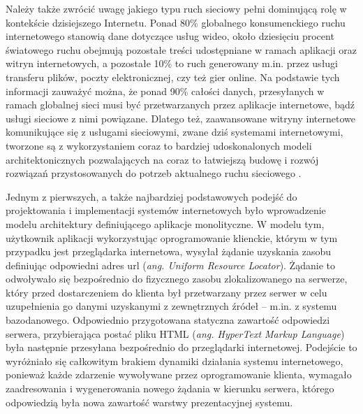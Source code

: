 Należy także zwrócić uwagę jakiego typu ruch sieciowy pełni dominującą rolę w kontekście dzisiejszego Internetu. Ponad 80\% globalnego konsumenckiego ruchu internetowego stanowią dane dotyczące usług wideo, około dziesięciu procent światowego ruchu obejmują pozostałe treści udostępniane w ramach aplikacji oraz witryn internetowych, a pozostałe 10\% to ruch generowany m.in. przez usługi transferu plików, poczty elektronicznej, czy też gier online. Na podstawie tych informacji zauważyć można, że ponad 90\% całości danych, przesyłanych w ramach globalnej sieci musi być przetwarzanych przez aplikacje internetowe, bądź usługi sieciowe z nimi powiązane. Dlatego też, zaawansowane witryny internetowe komunikujące się z usługami sieciowymi, zwane dziś systemami internetowymi, tworzone są z wykorzystaniem coraz to bardziej udoskonalonych modeli architektonicznych pozwalających na coraz to łatwiejszą budowę i rozwój rozwiązań przystosowanych do potrzeb aktualnego ruchu sieciowego \cite{CAIR20182023}.

Jednym z pierwszych, a także najbardziej podstawowych podejść do projektowania i implementacji systemów internetowych było wprowadzenie modelu architektury definiującego aplikacje monolityczne. W modelu tym, użytkownik aplikacji wykorzystując oprogramowanie klienckie, którym w tym przypadku jest przeglądarka internetowa, wysyłał żądanie uzyskania zasobu definiując odpowiedni adres url (\textit{ang. Uniform Resource Locator}). Żądanie to odwoływało się bezpośrednio do fizycznego zasobu zlokalizowanego na serwerze, który przed dostarczeniem do klienta był przetwarzany przez serwer w celu uzupełnienia go danymi uzyskanymi z zewnętrznych źródeł -- m.in. z systemu bazodanowego. Odpowiednio przygotowana statyczna zawartość odpowiedzi serwera, przybierająca postać pliku HTML (\textit{ang. HyperText Markup Language}) była następnie przesyłana bezpośrednio do przeglądarki internetowej. Podejście to wyróżniało się całkowitym brakiem dynamiki działania systemu internetowego, ponieważ każde zdarzenie wywoływane przez oprogramowanie klienta, wymagało zaadresowania i wygenerowania nowego żądania w kierunku serwera, którego odpowiedzią była nowa zawartość warstwy prezentacyjnej systemu.

